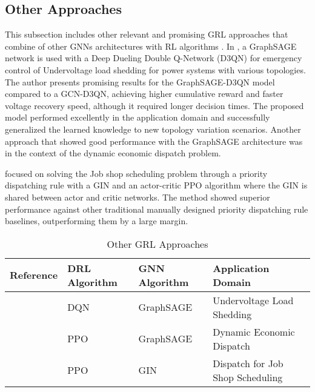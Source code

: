 \subsection{Other Approaches}

This subsection includes other relevant and promising \ac{GRL} approaches that combine of other \acp{GNN} architectures with \ac{RL} algorithms . In \cite{peiEmergencyControlStrategy2023}, a GraphSAGE network \cite{hamiltonInductiveRepresentationLearning2018} is used with a Deep Dueling Double Q-Network (D3QN) for emergency control of Undervoltage load shedding for power systems with various topologies. The author presents promising results for the GraphSAGE-D3QN model compared to a GCN-D3QN, achieving higher cumulative reward and faster voltage recovery speed, although it required longer decision times. The proposed model performed excellently in the application domain and successfully generalized the learned knowledge to new topology variation scenarios. Another approach that showed good performance with the GraphSAGE architecture was \cite{zhaoGraphbasedDeepReinforcement2022b} in the context of the dynamic economic dispatch problem. \par
\cite{zhangLearningDispatchJob2020} focused on solving the Job shop scheduling problem through a priority dispatching rule with a \ac{GIN} \cite{xuHowPowerfulAre2019} and an actor-critic \ac{PPO} algorithm where the \ac{GIN} is shared between actor and critic networks. The method showed superior performance against other traditional manually designed priority dispatching rule baselines, outperforming them by a large margin.

\begin{table}[H] 
	\centering
	\caption{Other \acs{GRL} Approaches}
	\begin{tabular}{|P{2cm}|P{2cm}|P{2cm}|p{5cm}|  }
		\hline
		\textbf{Reference} & \textbf{DRL Algorithm} & \textbf{GNN Algorithm} & \textbf{Application Domain} \\
		\hline
		\cite{peiEmergencyControlStrategy2023} & DQN & GraphSAGE & Undervoltage Load Shedding  \\ \hline
		\cite{zhaoGraphbasedDeepReinforcement2022b} & PPO & GraphSAGE  & Dynamic Economic Dispatch \\ \hline
		\cite{zhangLearningDispatchJob2020} & PPO & GIN & Dispatch for Job Shop Scheduling \\ \hline 
	\end{tabular}
	\label{tab:other-lit}
\end{table}


